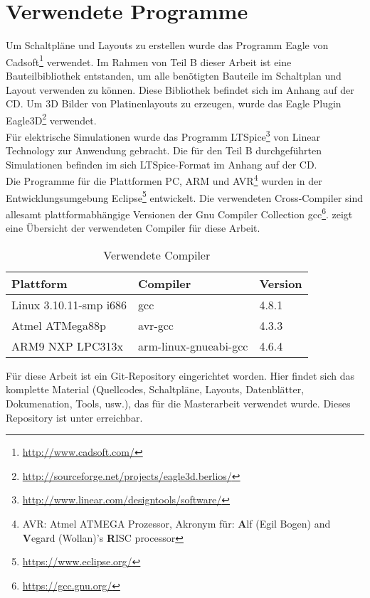 \section{Verwendete Programme}
Um Schaltpläne und Layouts zu erstellen wurde das Programm Eagle von Cadsoft\footnote{\url{http://www.cadsoft.com/}} verwendet. Im Rahmen von Teil B dieser Arbeit ist eine Bauteilbibliothek entstanden, um alle benötigten Bauteile im Schaltplan und Layout verwenden zu können. Diese Bibliothek befindet sich im Anhang auf der CD.
Um 3D Bilder von Platinenlayouts zu erzeugen, wurde das Eagle Plugin Eagle3D\footnote{\url{http://sourceforge.net/projects/eagle3d.berlios/}} verwendet.\\
Für elektrische Simulationen wurde das Programm LTSpice\footnote{\url{http://www.linear.com/designtools/software/}} von Linear Technology zur Anwendung gebracht. Die für den Teil B durchgeführten Simulationen befinden im sich LTSpice-Format im Anhang auf der CD.\\
Die Programme für die Plattformen PC, ARM und AVR\footnote{AVR: Atmel ATMEGA Prozessor, Akronym für: \textbf{A}lf (Egil Bogen) and \textbf{V}egard (Wollan)'s \textbf{R}ISC processor} wurden in der Entwicklungsumgebung Eclipse\footnote{\url{https://www.eclipse.org/}} entwickelt. Die verwendeten Cross-Compiler sind allesamt plattformabhängige Versionen der Gnu Compiler Collection gcc\footnote{\url{https://gcc.gnu.org/}}.  zeigt eine Übersicht der verwendeten Compiler für diese Arbeit.

\begin{table}[h]
\begin{tabular}{|p{4.5cm}|p{4cm}|p{4cm}|}\hline
\rowcolor{TableBackgroundColor} 
\textbf{Plattform}		&	\textbf{Compiler}		&	\textbf{Version}  \\ \hline
 Linux 3.10.11-smp i686	&	gcc						& 4.8.1	\\ \hline
 Atmel ATMega88p		&	avr-gcc					& 4.3.3	\\ \hline
 ARM9 NXP LPC313x		&	arm-linux-gnueabi-gcc	& 4.6.4	\\ \hline
\end{tabular}
\caption{Verwendete Compiler}
\label{tab:verwendete_compiler}
\end{table}

Für diese Arbeit ist ein Git-Repository eingerichtet worden. Hier findet sich das komplette Material (Quellcodes, Schaltpläne, Layouts, Datenblätter, Dokumenation, Tools, usw.), das für die Masterarbeit verwendet wurde. Dieses Repository ist unter  erreichbar.